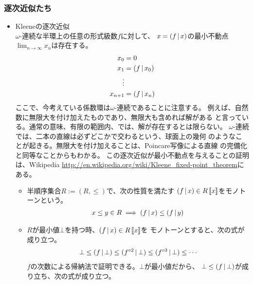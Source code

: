 {\subsubsection{逐次近似たち}\label{s3:逐次近似たち} %
	\begin{itemize}\setlength{\itemsep}{-1mm} %
		\item Kleeneの逐次近似 \\
		$\omega$-連続な半環上の任意の形式級数$f$に対して、
		$x=\mathinner{({f{\,|\,}x})}$の最小不動点$\lim_{n\to\infty}x_n$は存在する。
		\begin{equation*}\begin{split}
			x_0 &= 0 \\
			x_1 &= \mathinner{({f{\,|\,}x_0})} \\
			\vdots \\
			x_{n+1} &= \mathinner{({f{\,|\,}x_n})} \\
		\end{split}\end{equation*}
		ここで、今考えている係数環は$\omega$-連続であることに注意する。
		例えば、自然数に無限大を付け加えたものであり、無限大も含めれば解がある
		と言っている。通常の意味、有限の範囲内、では、解が存在するとは限らない。
		$\omega$-連続では、二本の直線は必ずどこかで交わるという、球面上の幾何
		のようなことが起きる。無限大を付け加えることは、Poincare写像による直線
		の完備化と同等なことからもわかる。
		この逐次近似が最小不動点を与えることの証明は、Wikipedia
		\url{http://en.wikipedia.org/wiki/Kleene_fixed-point_theorem}にある。
		\begin{itemize}\setlength{\itemsep}{-1mm} %
			\item 半順序集合$R:=(R,\le)$で、次の性質を満たす
			$\mathinner{({f{\,|\,}x})}\in R\mathinner{[\![{x}]\!]}$をモノトーンという。
			\begin{equation*}\begin{split}
				x\le y\in R \implies \mathinner{({f{\,|\,}x})}\le \mathinner{({f{\,|\,}y})}
			\end{split}\end{equation*}
			\item $R$が最小値$\bot$を持つ時、$\mathinner{({f{\,|\,}x})}\in R\mathinner{[\![{x}]\!]}$を
			モノトーンとすると、次の式が成り立つ。
			\begin{equation*}\begin{split}
				\bot\le \mathinner{({f{\,|\,}\bot})}\le \mathinner{({f^{\circ2}{\,|\,}\bot})}
				\le \mathinner{({f^{\circ3}{\,|\,}\bot})}\le\cdots
			\end{split}\end{equation*}
			$f$の次数による帰納法で証明できる。$\bot$が最小値だから、
			$\bot\le \mathinner{({f{\,|\,}\bot})}$が成り立ち、次の式が成り立つ。

\end{itemize}
\end{itemize}}
